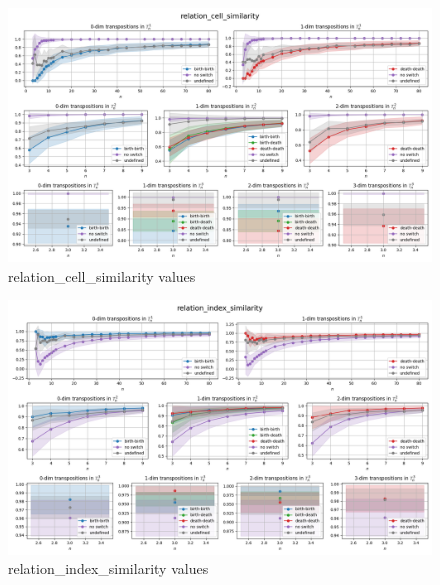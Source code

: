 \documentclass{article}
\begin{document}
\begin{figure}[h!]
    \hspace*{-3cm}
    \centering
    \includegraphics[width=1.5\textwidth]{pics/torus-transpositions/similaritites/score=relation-cell-similarity.png}
    \caption{relation\_cell\_similarity values}
    \label{fig:relation-cell-similarity}
\end{figure}
\begin{figure}[h!]
    \hspace*{-3cm}
    \centering
    \includegraphics[width=1.5\textwidth]{pics/torus-transpositions/similaritites/score=relation-index-similarity.png}
    \caption{relation\_index\_similarity values}
    \label{fig:relation-index-similarity}
\end{figure}
\end{document}
